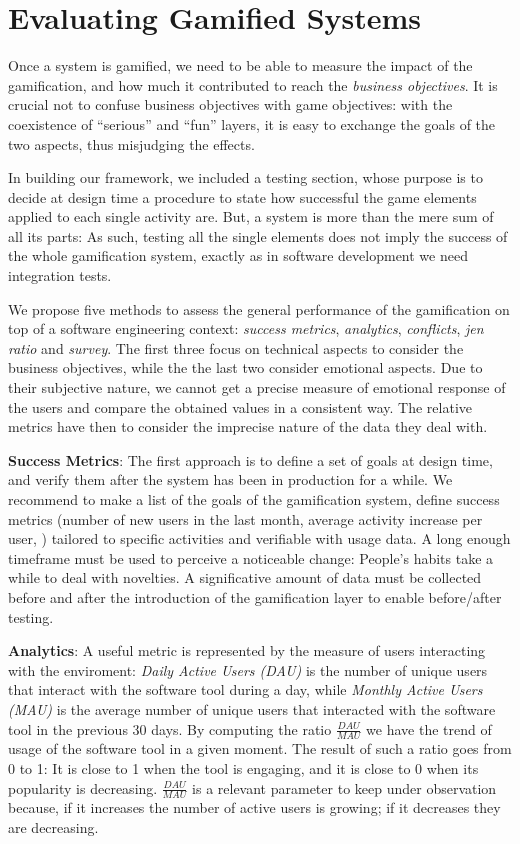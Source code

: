\section{Evaluating Gamified Systems}

Once a system is gamified, we need to be able to measure the impact of the gamification, and how much it contributed to reach the {\em business objectives}. It is crucial not to confuse business objectives with game objectives: with the coexistence of ``serious'' and ``fun'' layers, it is easy to exchange the goals of the two aspects, thus misjudging the effects.

In building our framework, we included a testing section, whose purpose is to decide at design time a procedure to state how successful the game elements applied to each single activity are. But, a system is more than the mere sum of all its parts: As such, testing all the single elements does not imply the success of the whole gamification system, exactly as in software development we need integration tests.

We propose five methods to assess the general performance of the gamification on top of a software engineering context: \emph{success metrics}, \emph{analytics}, \emph{conflicts}, \emph{jen ratio} and \emph{survey}. The first three focus on technical aspects to consider the business objectives, while the the last two consider emotional aspects. Due to their subjective nature, we cannot get a precise measure of emotional response of the users and compare the obtained values in a consistent way. The relative metrics have then to consider the imprecise nature of the data they deal with.

\textbf{Success Metrics}: The first approach is to define a set of goals at design time, and verify them after the system has been in production for a while. We recommend to make a list of the goals of the gamification system, define success metrics (number of new users in the last month, average activity increase per user, \etc) tailored to specific activities and verifiable with usage data. A long enough timeframe must be used to perceive a noticeable change: People's habits take a while to deal with novelties. A significative amount of data must be collected before and after the introduction of the gamification layer to enable before/after testing.

\textbf{Analytics}: A useful metric is represented by the measure of users interacting with the enviroment: \emph{Daily Active Users (DAU)} is the number of unique users that interact with the software tool during a day, while \emph{Monthly Active Users (MAU)} is the average number of unique users that interacted with the software tool in the previous 30 days. By computing the ratio $\frac{\textit{DAU}}{\textit{MAU}}$ we have the trend of usage of the software tool in a given moment. The result of such a ratio goes from 0 to 1: It is close to 1 when the tool is engaging, and it is close to 0 when its popularity is decreasing. $\frac{\textit{DAU}}{\textit{MAU}}$ is a relevant parameter to keep under observation because, if it increases the number of active users is growing; if it decreases they are decreasing.

